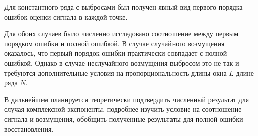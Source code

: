 \documentclass[12pt,a4paper]{article}
\begin{document}
Для константного ряда с выбросами был получен явный вид первого порядка ошибок оценки сигнала в каждой точке.

Для обоих случаев было численно исследовано соотношение между первым порядком ошибки и полной ошибкой.
В случае случайного возмущения оказалось, что первый порядок ошибки практически совпадает с полной ошибкой. Однако в случае неслучайного возмущения выбросом это не так и требуются дополнительные условия на пропорциональность длины окна $L$ длине ряда $N$.

В дальнейшем планируется теоретически подтвердить численный результат для случая комплексной экспоненты, подробнее изучить условие на соотношение сигнала и возмущения, обобщить полученные результаты для полной ошибки восстановления.





\end{document}
